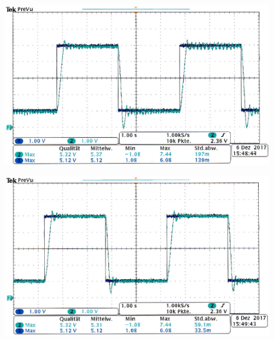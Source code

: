 \endminipage
%
\par
%
\minipage{\linewidth}
    \begin{center}
        \captionsetup{type=figure}
        \begin{adjustbox}{max width=\linewidth, keepaspectratio}
            \includegraphics[width=120mm]{jpg/Sinus-KP-gross-KI-gross}
        \end{adjustbox}
        \label{fig:Sinus-KP-gross-KI-gross}
    \end{center}
\endminipage
%
\par
%
\minipage{\linewidth}
    \begin{center}
        \captionsetup{type=figure}
        \begin{adjustbox}{max width=\linewidth, keepaspectratio}
            \includegraphics[width=120mm]{jpg/Sinus-KP-gross-KI-klein}
        \end{adjustbox}
        \label{fig:Sinus-KP-gross-KI-klein}
    \end{center}
\endminipage
%
